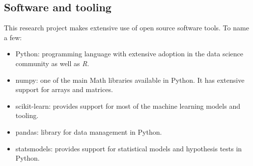 \subsection{Software and tooling}
\label{sec:material_software_and_tooling}

This research project makes extensive use of open source software tools. To name a few:

\begin{itemize}
    \item Python: programming language with extensive adoption in the data science community as well as \emph{R}.
    \item numpy: one of the main Math libraries available in Python. It has extensive support for arrays and matrices.
    \item scikit-learn: provides support for most of the machine learning models and tooling.
    \item pandas: library for data management in Python.
    \item statsmodels: provides support for statistical models and hypothesis tests in Python.
\end{itemize}
